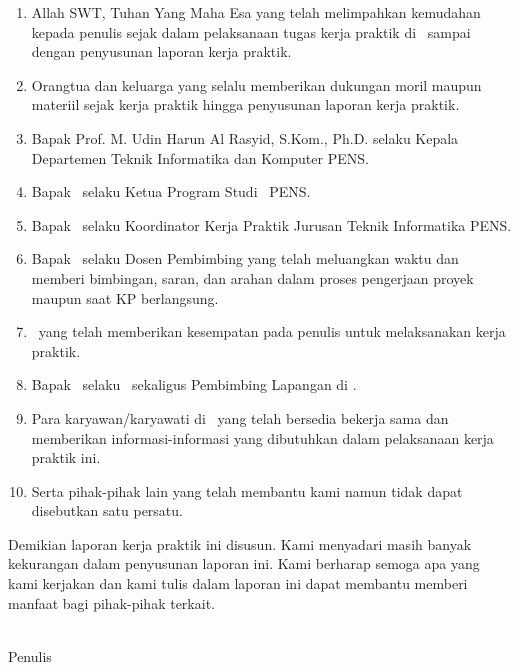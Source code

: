\begin{enumerate}[label=\arabic*., leftmargin=*, itemsep=0pt]
  \item Allah SWT, Tuhan Yang Maha Esa yang telah melimpahkan kemudahan kepada penulis
        sejak dalam pelaksanaan tugas kerja praktik di \NamaPerusahaan\ sampai dengan
        penyusunan laporan kerja praktik.
  \item Orangtua dan keluarga yang selalu memberikan dukungan moril maupun materiil sejak
        kerja praktik hingga penyusunan laporan kerja praktik.
  \item Bapak Prof. M. Udin Harun Al Rasyid, S.Kom., Ph.D. selaku Kepala Departemen Teknik
        Informatika dan Komputer PENS.
  \item Bapak \NamaKetuaProdi\ selaku Ketua Program Studi \NamaProdi\ PENS.
  \item Bapak \NamaKoordinatorKP\ selaku Koordinator Kerja Praktik Jurusan Teknik Informatika PENS.
  \item Bapak \NamaPembimbing\ selaku Dosen Pembimbing yang telah meluangkan waktu dan
        memberi bimbingan, saran, dan arahan dalam proses pengerjaan proyek maupun saat KP
        berlangsung.
  \item \NamaPerusahaan\ yang telah memberikan kesempatan pada penulis untuk melaksanakan
        kerja praktik.
  \item Bapak \NamaPembimbingLapangan\ selaku \JabatanPembimbingLapangan\ sekaligus
        Pembimbing Lapangan di \NamaPerusahaan.
  \item Para karyawan/karyawati di \NamaPerusahaan\ yang telah bersedia bekerja sama dan
        memberikan informasi-informasi yang dibutuhkan dalam pelaksanaan kerja praktik ini.
  \item Serta pihak-pihak lain yang telah membantu kami namun tidak dapat disebutkan satu
        persatu.
\end{enumerate}

Demikian laporan kerja praktik ini disusun. Kami menyadari masih banyak kekurangan dalam
penyusunan laporan ini. Kami berharap semoga apa yang kami kerjakan dan kami tulis dalam
laporan ini dapat membantu memberi manfaat bagi pihak-pihak terkait.

\vspace{1cm}
\begin{flushright}
  \TanggalPengesahan\\[2.0cm]
  Penulis
\end{flushright}
